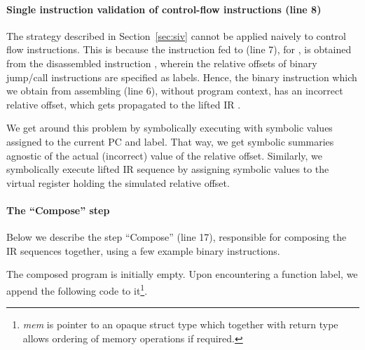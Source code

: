 \paragraph{Single instruction validation of control-flow instructions (line
8)}\label{sec:sivcntrl}

The \siv strategy described in Section~\ref{sec:siv} cannot be applied naively  
to control flow instructions. This is because the instruction fed to \mcsema 
(line 7), for \siv, is obtained from the disassembled instruction ,
wherein the relative offsets of binary jump/call instructions are specified as labels. 
Hence, the binary instruction  which we obtain from assembling  
(line 6), without program context, has an incorrect relative offset, which gets 
propagated to the lifted IR .

We get around this problem by symbolically executing  with 
symbolic values 
assigned to the current PC and label.
That way, we get symbolic
summaries agnostic of the actual (incorrect) value of the relative offset.
Similarly, we symbolically execute  lifted IR sequence by assigning symbolic
values to the virtual register holding the simulated relative offset.


\paragraph{The ``Compose'' step}
Below we describe the step ``Compose'' (line 17), responsible for
composing the IR sequences together, using a few example binary
instructions.

The composed program is initially empty. Upon encountering a function label, we
append the following code to it\footnote{\emph{mem} is pointer to an opaque 
struct type which together with return type allows ordering of memory
    operations if required.}.

